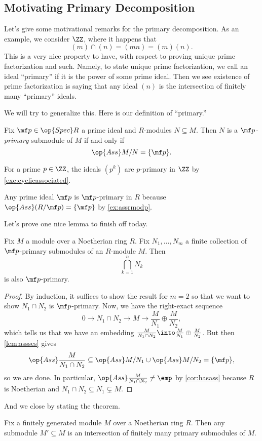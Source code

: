 \subsection{Motivating Primary Decomposition}
Let's give some motivational remarks for the primary decomposition. As an example, we consider $\ZZ$, where it happens that
\[(m)\cap(n)=(mn)=(m)(n).\]
This is a very nice property to have, with respect to proving unique prime factorization and such. Namely, to state unique prime factorization, we call an ideal ``primary'' if it is the power of some prime ideal. Then we see existence of prime factorization is saying that any ideal $(n)$ is the intersection of finitely many ``primary'' ideals.

We will try to generalize this. Here is our definition of ``primary.''
\begin{definition}
	Fix $\mf p\in\op{Spec}R$ a prime ideal and $R$-modules $N\subseteq M$. Then $N$ is a \textit{$\mf p$-primary} submodule of $M$ if and only if
	\[\op{Ass}M/N=\{\mf p\}.\]
\end{definition}
\begin{example}
	For a prime $p\in\ZZ$, the ideals $\left(p^k\right)$ are $p$-primary in $\ZZ$ by \autoref{exe:cyclicassociated}.
\end{example}
\begin{example}
	Any prime ideal $\mf p$ is $\mf p$-primary in $R$ because $\op{Ass}(R/\mf p)=\{\mf p\}$ by \autoref{ex:assrmodp}.
\end{example}
Let's prove one nice lemma to finish off today.
\begin{lemma} \label{lem:intersectprimary}
	Fix $M$ a module over a Noetherian ring $R$. Fix $N_1,\ldots,N_m$ a finite collection of $\mf p$-primary submodules of an $R$-module $M$. Then
	\[\bigcap_{k=1}^nN_k\]
	is also $\mf p$-primary.
\end{lemma}
\begin{proof}
	By induction, it suffices to show the result for $m=2$ so that we want to show $N_1\cap N_2$ is $\mf p$-primary. Now, we have the right-exact sequence
	\[0\to N_1\cap N_2\to M\to\frac M{N_1}\oplus\frac M{N_2},\]
	which tells us that we have an embedding $\frac M{N_1\cap N_2}\into\frac M{N_1}\oplus\frac M{N_2}$. But then \autoref{lem:assses} gives
	\[\op{Ass}\frac M{N_1\cap N_2}\subseteq\op{Ass}M/N_1\cup\op{Ass}M/N_2=\{\mf p\},\]
	so we are done. In particular, $\op{Ass}\frac M{N_1\cap N_2}\ne\emp$ by \autoref{cor:hasass} because $R$ is Noetherian and $N_1\cap N_2\subseteq N_1\subsetneq M$.
\end{proof}
And we close by stating the theorem.
\begin{theorem}
	Fix a finitely generated module $M$ over a Noetherian ring $R$. Then any submodule $M'\subseteq M$ is an intersection of finitely many primary submodules of $M$.
\end{theorem}